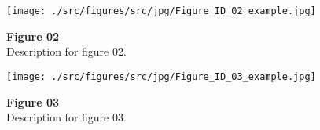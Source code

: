 \documentclass[preprint,review,12pt]{elsarticle}\n
\begin{document}
\clearpage
\begin{figure*}[p]
    \centering
    \texttt{[image: ./src/figures/src/jpg/Figure\_ID\_02\_example.jpg]}
    \caption{
\textbf{
Figure 02
}
\smallskip
\\
Description for figure 02.
}
    \label{fig:02_example}
\end{figure*}

\clearpage
\begin{figure*}[p]
    \centering
    \texttt{[image: ./src/figures/src/jpg/Figure\_ID\_03\_example.jpg]}
    \caption{
\textbf{
Figure 03
}
\smallskip
\\
Description for figure 03.
}
    \label{fig:03_example}
\end{figure*}

\n

\end{document}
